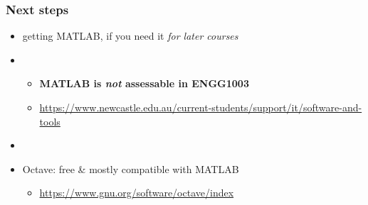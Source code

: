 \documentclass[english,14pt]{beamer}
\begin{document}

\begin{frame}[fragile]

\frametitle{Next steps}
\begin{itemize}
	\item getting MATLAB, if you need it \emph{for later courses}
	\item[]
	\begin{itemize}
		\item \textbf{MATLAB is \emph{not} assessable in ENGG1003}
		\item \href{https://www.newcastle.edu.au/current-students/support/it/software-and-tools}{https://www.newcastle.edu.au/current-students/support/it/software-and-tools}
	\end{itemize}
	\item[]
	\item Octave: free \& mostly compatible with MATLAB
	\begin{itemize}
		\item \href{https://www.gnu.org/software/octave/index}{https://www.gnu.org/software/octave/index}
	\end{itemize}
\end{itemize}
	
\end{frame}
\end{document}
